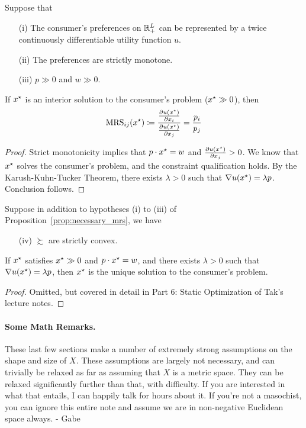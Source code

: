 \documentclass[12pt]{article}
\begin{document}
\begin{proposition}\label{prop:necessary_mrs}
	 Suppose that
	\begin{itemize}
		\item[(i)] The consumer's preferences on $\mathbb{R}^L_+$ can be represented by a twice continuously differentiable utility function $u$.
		
		\item[(ii)] The preferences are strictly monotone.
		
		\item[(iii)] $p \gg 0$ and $w \gg 0$.
	\end{itemize}
	If $x^\star$ is an interior solution to the consumer's problem (\ie $x^\star \gg 0$), then
	\[
	\text{MRS}_{ij}(x^\star) \coloneqq \frac{\frac{\partial u(x^\star)}{\partial x_i}}{\frac{\partial u(x^\star)}{\partial x_j}} = \frac{p_i}{p_j}
	\]
\end{proposition}
\begin{proof}
	Strict monotonicity implies that $p \cdot x^\star = w$ and $\frac{\partial u(x^\star)}{\partial x_j} > 0$. We know that $x^\star$ solves the consumer's problem, and the constraint qualification holds. By the Karush-Kuhn-Tucker Theorem, there exists $\lambda > 0$ such that $\nabla u(x^\star) = \lambda p$. Conclusion follows.
\end{proof}

\begin{proposition}\label{prop:sufficient_unique}
	 Suppose in addition to hypotheses (i) to (iii) of Proposition~\ref{prop:necessary_mrs}, we have 
	\begin{itemize}
		\item[(iv)] $\succsim$ are strictly convex. 
	\end{itemize}
	If $x^\star$ satisfies $x^\star \gg 0$ and $p \cdot x^\star = w$, and there exists $\lambda > 0$ such that $\nabla u(x^\star) = \lambda p$, then $x^\star$ is the unique solution to the consumer's problem.
\end{proposition}
\begin{proof}
	Omitted, but covered in detail in Part 6: Static Optimization of Tak's lecture notes.
\end{proof}

\paragraph{Some Math Remarks.} These last few sections make a number of extremely strong assumptions on the shape and size of $X$. These assumptions are largely not necessary, and can trivially be relaxed as far as assuming that $X$ is a metric space. They can be relaxed significantly further than that, with difficulty. If you are interested in what that entails, I can happily talk for hours about it. If you're not a masochist, you can ignore this entire note and assume we are in non-negative Euclidean space always. - Gabe
\end{document}
